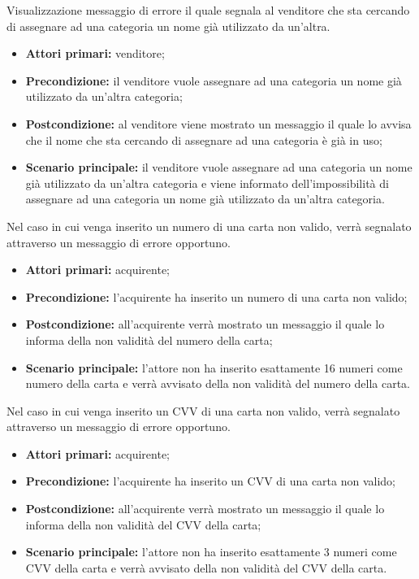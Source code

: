 Visualizzazione messaggio di errore il quale segnala al venditore che sta cercando di assegnare ad una categoria un nome già utilizzato da un'altra.
\begin{itemize}
    \item \textbf{Attori primari:} venditore;
    \item \textbf{Precondizione:} il venditore vuole assegnare ad una categoria un nome già utilizzato da un'altra categoria;
    \item \textbf{Postcondizione:} al venditore viene mostrato un messaggio il quale lo avvisa che il nome che sta cercando di assegnare ad una categoria è già in uso;
    \item \textbf{Scenario principale:} il venditore vuole assegnare ad una categoria un nome già utilizzato da un'altra categoria e viene informato dell'impossibilità di assegnare ad una categoria un nome già utilizzato da un'altra categoria.
\end{itemize}


Nel caso in cui venga inserito un numero di una carta non valido, verrà segnalato attraverso un messaggio di errore opportuno.
\begin{itemize}
	\item \textbf{Attori primari:} acquirente;
	\item \textbf{Precondizione:} l'acquirente ha inserito un numero di una carta non valido;
	\item \textbf{Postcondizione:} all'acquirente verrà mostrato un messaggio il quale lo informa della non validità del numero della carta;
	\item \textbf{Scenario principale:} l'attore non ha inserito esattamente 16 numeri come numero della carta e verrà avvisato della non validità del numero della carta.
\end{itemize}

Nel caso in cui venga inserito un CVV di una carta non valido, verrà segnalato attraverso un messaggio di errore opportuno.
\begin{itemize}
	\item \textbf{Attori primari:} acquirente;
	\item \textbf{Precondizione:} l'acquirente ha inserito un CVV di una carta non valido;
	\item \textbf{Postcondizione:} all'acquirente verrà mostrato un messaggio il quale lo informa della non validità del CVV della carta;
	\item \textbf{Scenario principale:} l'attore non ha inserito esattamente 3 numeri come CVV della carta e verrà avvisato della non validità del CVV della carta.
\end{itemize}

